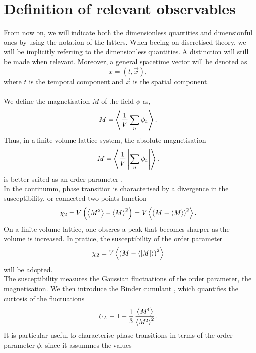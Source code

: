 \section{Definition of relevant observables}
\label{sec:observables}
From now on, we will indicate both the dimensionless quantities and dimensionful ones by using the notation of the latters. When beeing on discretised theory, we will be implicitly referring to the dimensionless quantities. A distinction will still be made when relevant. Moreover, a general spacetime vector 
will be denoted as 
\begin{equation*}
    x = (t, \vec{x}),
\end{equation*}
where $t$ is the temporal component and $\vec{x}$ is the spatial component. \\~\\
We define the magnetisation $M$ of the field $\phi$ as,
\begin{equation*}
    M = \left\langle \frac{1}{V}\sum_n \phi_n \right\rangle.
\end{equation*}
Thus, in a finite volume lattice system, the absolute magnetisation
\begin{equation*}
    M = \left\langle \frac{1}{V}\left|\sum_n \phi_n\right| \right\rangle.
\end{equation*}
is better suited as an order parameter \cite{friedli_velenik_2017,gattringer_LQCD}. \\
In the continumm, phase transition is characterised by a divergence in the susceptibility, or connected two-points function
\begin{equation*}
    \chi_2 = V \left(\left\langle M^2 \right\rangle - \left\langle M \right\rangle^2\right) = V \left\langle \left(M-\left\langle M \right\rangle\right)^2 \right\rangle.
\end{equation*}
On a finite volume lattice, one obseres a peak that becomes sharper as the volume is increased. In pratice, the susceptibility of the order parameter 
\begin{equation}
    \chi_2 = V \left\langle \left(M-\left\langle |M| \right\rangle\right)^2 \right\rangle
    \label{eq:abs_susceptibility}
\end{equation}
will be adopted. \\
The susceptibility measures the Gaussian fluctuations of the order parameter, the magnetisation. We then introduce the Binder cumulant \cite{binder2010monte}, which quantifies the curtosis of the fluctuations
\begin{equation*}
    U_L \equiv 1 - \frac{1}{3} \, \frac{\left\langle M^4 \right\rangle}{\left\langle M^2 \right\rangle^2}.
\end{equation*}
It is particular useful to characterise phase transitions in terms of the order parameter $\phi$, since it assummes the values 

